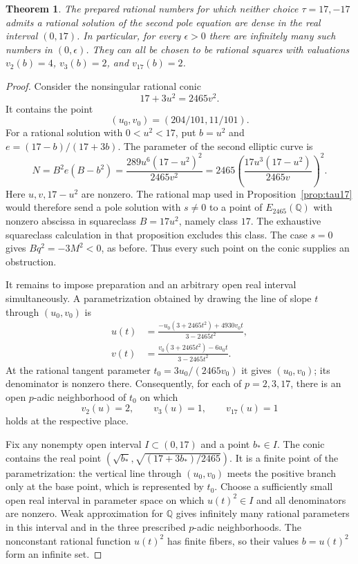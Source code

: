 \documentclass[11pt,a4paper]{article}
\newtheorem{theorem}{Theorem}[section]
\theoremstyle{definition}\newtheorem{definition}[theorem]{Definition}
\newcommand{\Q}{\mathbb Q}\newcommand{\Z}{\mathbb Z}
\begin{document}
\begin{theorem}\label{thm:small-tau17}
The prepared rational numbers for which neither choice
$\tau=17,-17$ admits a rational solution of the second pole equation
are dense in the real interval $(0,17)$. In particular, for every
$\epsilon>0$ there are infinitely many such numbers in $(0,\epsilon)$.
They can all be chosen to be rational squares with valuations
$v_2(b)=4$, $v_3(b)=2$, and $v_{17}(b)=2$.
\end{theorem}
\begin{proof}
Consider the nonsingular rational conic
\begin{equation}\label{eq:small-conic}
                 17+3u^2=2465v^2.
\end{equation}
It contains the point
\[
                    (u_0,v_0)=(204/101,11/101).
\]
For a rational solution with $0<u^2<17$, put $b=u^2$ and
$e=(17-b)/(17+3b)$. The parameter of the second elliptic curve is
\[
 N=B^2e(B-b^2)
   =\frac{289u^6(17-u^2)^2}{2465v^2}
   =2465\left(\frac{17u^3(17-u^2)}{2465v}\right)^2.
\]
Here $u,v,17-u^2$ are nonzero. The rational map used in
Proposition~\ref{prop:tau17} would therefore send a pole solution
with $s\ne0$ to a point of $E_{2465}(\Q)$ with nonzero abscissa
in squareclass $B=17u^2$, namely class $17$. The exhaustive
squareclass calculation in that proposition excludes this class.
The case $s=0$ gives $Bq^2=-3M^2<0$, as before. Thus every such
point on the conic supplies an obstruction.

It remains to impose preparation and an arbitrary open real interval
simultaneously. A parametrization obtained by drawing the line of
slope $t$ through $(u_0,v_0)$ is
\begin{equation}\label{eq:small-param}
 \begin{split}
 u(t)&=\frac{-u_0(3+2465t^2)+4930v_0t}{3-2465t^2},\\
 v(t)&=\frac{v_0(3+2465t^2)-6u_0t}{3-2465t^2}.
 \end{split}
\end{equation}
At the rational tangent parameter
$t_0=3u_0/(2465v_0)$ it gives $(u_0,v_0)$; its denominator
is nonzero there. Consequently, for each of $p=2,3,17$, there
is an open $p$-adic neighborhood of $t_0$ on which
\[
                v_2(u)=2,\qquad v_3(u)=1,\qquad v_{17}(u)=1
\]
holds at the respective place.

Fix any nonempty open interval $I\subset(0,17)$ and a point $b_*\in I$.
The conic contains the real point
$(\sqrt{b_*},\sqrt{(17+3b_*)/2465})$.
It is a finite point of the parametrization: the vertical line through
$(u_0,v_0)$ meets the positive branch only at the base point, which
is represented by $t_0$. Choose a sufficiently small open real
interval in parameter space on which $u(t)^2\in I$ and all
denominators are nonzero. Weak approximation for $\Q$ gives infinitely many rational
parameters in this interval and in the three prescribed $p$-adic
neighborhoods. The nonconstant rational function $u(t)^2$ has finite
fibers, so their values $b=u(t)^2$ form an infinite set.


\end{proof}
\end{document}
